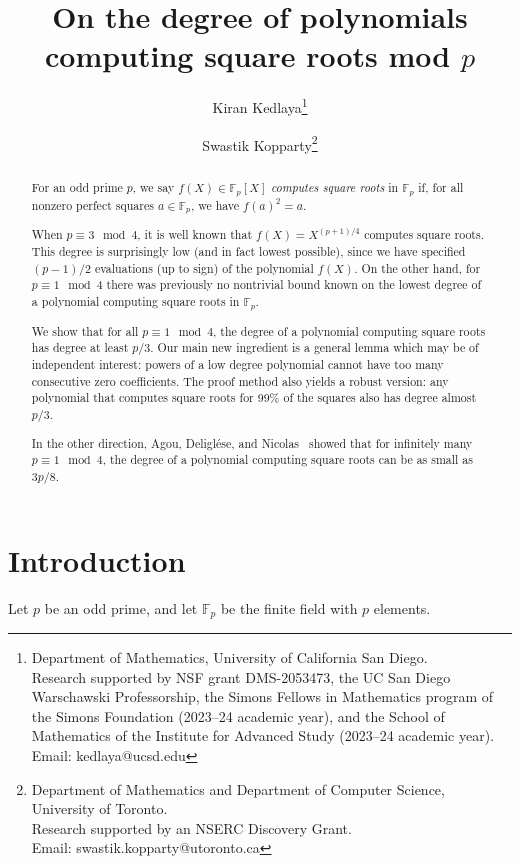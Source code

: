 \documentclass{article}
\newcommand{\F}{\mathbb{F}}
\begin{document}
\title{On the degree of polynomials computing square roots mod $p$}
\author{ Kiran Kedlaya\thanks{
Department of Mathematics, University of California San Diego.\\
Research supported by NSF grant DMS-2053473, the UC San Diego
Warschawski Professorship, the Simons Fellows in Mathematics program of
the Simons Foundation (2023--24 academic year), and the School of
Mathematics of the Institute for Advanced Study (2023--24 academic year).\\
Email: kedlaya@ucsd.edu
}
 \and Swastik Kopparty\thanks{
Department of Mathematics and Department of Computer Science, University of Toronto.\\
Research supported by an NSERC Discovery Grant.\\
Email: swastik.kopparty@utoronto.ca
}
}
\date{}
\maketitle

\begin{abstract}
For an odd prime $p$, we say $f(X) \in {\mathbb F}_p[X]$ {\em computes square roots} in $\mathbb F_p$ if, for all nonzero perfect squares $a \in \mathbb F_p$, we have $f(a)^2 = a$.
 
When $p \equiv 3 \mod 4$, it is well known that $f(X) = X^{(p+1)/4}$ computes square roots. This degree is surprisingly low (and in fact lowest possible), since we have specified $(p-1)/2$ evaluations (up to sign) of the polynomial $f(X)$.
On the other hand, for $p \equiv 1 \mod 4$ there was previously no nontrivial bound known on the lowest degree of a polynomial computing square roots in $\mathbb F_p$.

We show that for all $p \equiv 1 \mod 4$, the degree of a polynomial computing square roots has degree at least $p/3$. 
Our main new ingredient is a general lemma which may be of independent interest: powers of a low degree polynomial cannot have too many consecutive zero coefficients.
The proof method also yields a robust version: any polynomial that computes square roots for 99\% of the squares also has degree almost $p/3$. 

In the other direction, Agou, Deligl{\'e}se, and Nicolas~\cite{ADN-sqrt} showed that for infinitely many $p \equiv 1 \mod 4$, the degree of a polynomial computing square roots can be as small as $3p/8$. 
\end{abstract}

\section{Introduction}
Let $p$ be an odd prime, and let $\F_p$ be the finite field with $p$ elements.
\end{document}
